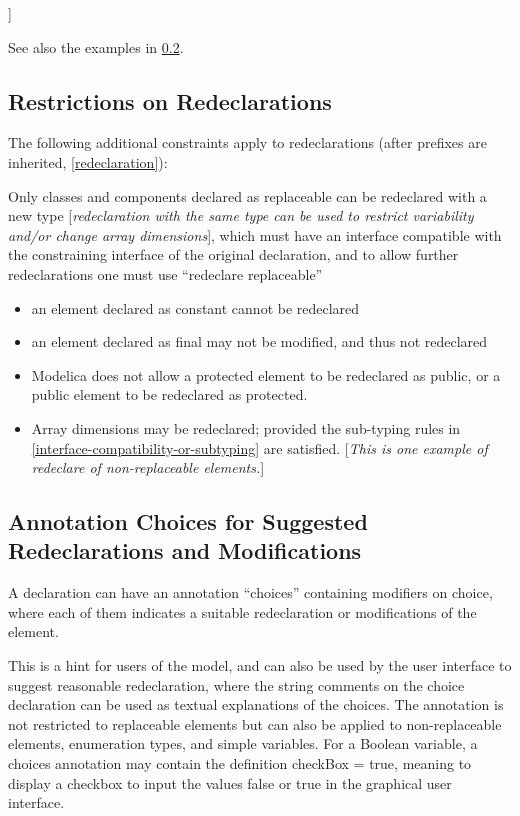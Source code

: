 \documentclass[10pt,a4paper]{report}
\def\doublelabel#1{\label{#1}\hypertarget{#1}{}}
\begin{document}
{]}

See also the examples in \ref{annotation-choices-for-suggested-redeclarations-and-modifications}.

\subsection{Restrictions on Redeclarations}\doublelabel{restrictions-on-redeclarations}

The following additional constraints apply to redeclarations (after
prefixes are inherited, \ref{redeclaration}):

Only classes and components declared as replaceable can be redeclared
with a new type {[}\emph{redeclaration with the same type can be used to
restrict variability and/or change array dimensions}{]}, which must have
an interface compatible with the constraining interface of the original
declaration, and to allow further redeclarations one must use
``redeclare replaceable''

\begin{itemize}
\item
  an element declared as constant cannot be redeclared
\item
  an element declared as final may not be modified, and thus not
  redeclared
\item
  Modelica does not allow a protected element to be redeclared as
  public, or a public element to be redeclared as protected.
\item
  Array dimensions may be redeclared; provided the sub-typing rules in
  \ref{interface-compatibility-or-subtyping} are satisfied. {[}\emph{This is one example of redeclare of
  non-replaceable elements.}{]}
\end{itemize}

\subsection{Annotation Choices for Suggested Redeclarations and Modifications}\doublelabel{annotation-choices-for-suggested-redeclarations-and-modifications}

A declaration can have an annotation ``choices'' containing modifiers on
choice, where each of them indicates a suitable redeclaration or
modifications of the element.

This is a hint for users of the model, and can also be used by the user
interface to suggest reasonable redeclaration, where the string comments
on the choice declaration can be used as textual explanations of the
choices. The annotation is not restricted to replaceable elements but
can also be applied to non-replaceable elements, enumeration types, and
simple variables. For a Boolean variable, a choices annotation may
contain the definition checkBox = true, meaning to display a checkbox to
input the values false or true in the graphical user interface.
\end{document}
